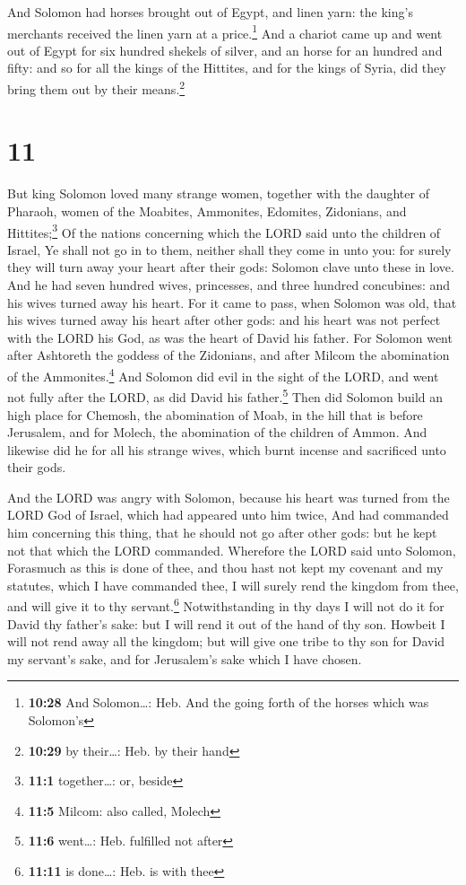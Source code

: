  And Solomon had horses brought out of Egypt, and linen
yarn: the king's merchants received the linen yarn at a
price.\footnote{\textbf{10:28} And Solomon\ldots: Heb. And the going
  forth of the horses which was Solomon's}  And a chariot
came up and went out of Egypt for six hundred shekels of silver, and an
horse for an hundred and fifty: and so for all the kings of the
Hittites, and for the kings of Syria, did they bring them out by their
means.\footnote{\textbf{10:29} by their\ldots: Heb. by their hand}

\hypertarget{section-10}{%
\section{11}\label{section-10}}

 But king Solomon loved many strange women, together with
the daughter of Pharaoh, women of the Moabites, Ammonites, Edomites,
Zidonians, and Hittites;\footnote{\textbf{11:1} together\ldots: or,
  beside}  Of the nations concerning which the LORD said
unto the children of Israel, Ye shall not go in to them, neither shall
they come in unto you: for surely they will turn away your heart after
their gods: Solomon clave unto these in love.  And he had
seven hundred wives, princesses, and three hundred concubines: and his
wives turned away his heart.  For it came to pass, when
Solomon was old, that his wives turned away his heart after other gods:
and his heart was not perfect with the LORD his God, as was the heart of
David his father.  For Solomon went after Ashtoreth the
goddess of the Zidonians, and after Milcom the abomination of the
Ammonites.\footnote{\textbf{11:5} Milcom: also called, Molech}
 And Solomon did evil in the sight of the LORD, and went
not fully after the LORD, as did David his father.\footnote{\textbf{11:6}
  went\ldots: Heb. fulfilled not after}  Then did Solomon
build an high place for Chemosh, the abomination of Moab, in the hill
that is before Jerusalem, and for Molech, the abomination of the
children of Ammon.  And likewise did he for all his
strange wives, which burnt incense and sacrificed unto their gods.

 And the LORD was angry with Solomon, because his heart
was turned from the LORD God of Israel, which had appeared unto him
twice,  And had commanded him concerning this thing, that
he should not go after other gods: but he kept not that which the LORD
commanded.  Wherefore the LORD said unto Solomon,
Forasmuch as this is done of thee, and thou hast not kept my covenant
and my statutes, which I have commanded thee, I will surely rend the
kingdom from thee, and will give it to thy servant.\footnote{\textbf{11:11}
  is done\ldots: Heb. is with thee}  Notwithstanding in
thy days I will not do it for David thy father's sake: but I will rend
it out of the hand of thy son.  Howbeit I will not rend
away all the kingdom; but will give one tribe to thy son for David my
servant's sake, and for Jerusalem's sake which I have chosen.

